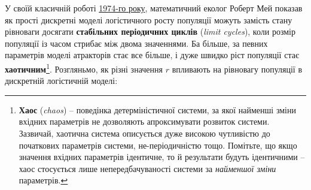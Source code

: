 \documentclass[
  11pt,
]{book}
\begin{document}
У своїй класичній роботі \href{https://doi.org/10.1126/science.186.4164.645}{1974-го року}, математичний еколог Роберт Мей показав як прості дискретні моделі логістичного росту популяції можуть замість стану рівноваги досягати \textbf{стабільних періодичних циклів} (\emph{limit cycles}), коли розмір популяції із часом стрибає між двома значеннями. Ба більше, за певних параметрів моделі атракторів стає все більше, і дуже швидко ріст популяції стає \textbf{хаотичним}\footnote{\textbf{Хаос} (\emph{chaos}) -- поведінка детерміністичної системи, за якої найменші зміни вхідних параметрів не дозволяють апроксимувати розвиток системи. Зазвичай, хаотична система описується дуже високою чутливістю до початкових параметрів системи, не-періодичністю тощо. Помітьте, що якщо значення вхідних параметрів ідентичне, то й результати будуть ідентичними -- хаос стосується лише непередбачуваності системи за \emph{найменшої зміни} параметрів.}. Розгляньмо, як різні значення \(r\) впливають на рівновагу популяції в дискретній логістичній моделі:
\end{document}
